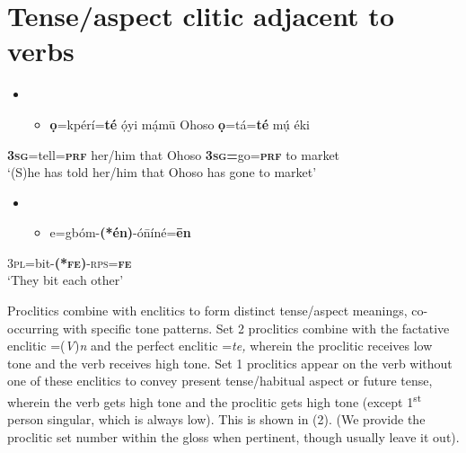 \chapter[Tense/aspect clitic adjacent to verbs]{Tense/aspect clitic adjacent to verbs}
\label{bkm:Ref406316661}\setcounter{itemize}{0}
\begin{itemize}
\item \setcounter{itemize}{0}
\begin{itemize}
\item \gll \textbf{ọ}=kpérí=\textbf{té}   ọ́yi     mạ́m\={u}   Ohoso   \textbf{ọ}=tá=\textbf{té}     mụ́  éki\\
\end{itemize}
\end{itemize}
     \textbf{  }\textbf{3}\textbf{\textsc{sg}}=tell=\textbf{\textsc{prf}}   her/him  that     Ohoso  \textbf{3}\textbf{\textsc{sg}}\textbf{=}go=\textbf{\textsc{prf}}  to  market\\
\glt   ‘(S)he has told her/him that Ohoso has gone to market’ \citep[63]{Kari2004}
\z

\begin{itemize}
\item \setcounter{itemize}{0}
\begin{itemize}
\item \gll e=gbóm-\textbf{(*én)}{}-ó\={n}íné=\textbf{\={e}n}\\
\end{itemize}
\end{itemize}
       3\textsc{pl}=bit-\textbf{(*}\textbf{\textsc{fe}}\textbf{)}{}-\textsc{rps}=\textbf{\textsc{fe}}\\
\glt   ‘They bit each other’ \citep[149]{Kari2004}
\z

Proclitics combine with enclitics to form distinct tense/aspect meanings, co-occurring with specific tone patterns. Set 2 proclitics combine with the factative enclitic =(\textit{V})\textit{n} and the perfect enclitic =\textit{te, }wherein the proclitic receives low tone and the verb receives high tone. Set 1 proclitics appear on the verb without one of these enclitics to convey present tense/habitual aspect or future tense, wherein the verb gets high tone and the proclitic gets high tone (except 1\textsuperscript{st} person singular, which is always low). This is shown in (2). (We provide the proclitic set number within the gloss when pertinent, though usually leave it out).

